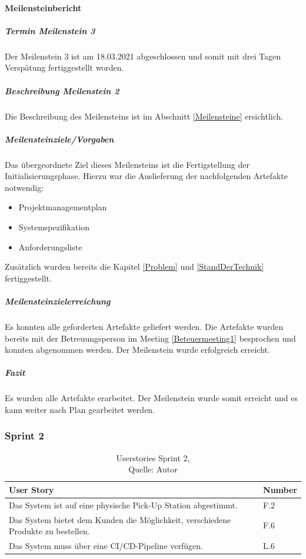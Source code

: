 \paragraph{Meilensteinbericht}
\subparagraph{Termin Meilenstein 3}
Der Meilenstein 3 ist am 18.03.2021 abgeschlossen und somit mit drei Tagen Verspätung fertiggestellt worden. 
\subparagraph{Beschreibung Meilenstein 2}
Die Beschreibung des Meilensteins ist im Abschnitt \ref{Meilensteine} ersichtlich. 
\subparagraph{Meilensteinziele/Vorgaben}
Das übergeordnete Ziel dieses Meilensteins ist die Fertigstellung der Initialisierungsphase.
Hierzu war die Auslieferung der nachfolgenden Artefakte notwendig:
\begin{itemize}
	\item Projektmanagementplan
	\item Systemspezifikation
	\item Anforderungsliste
\end{itemize}
Zusätzlich wurden bereits die Kapitel \ref{Problem} und \ref{StandDerTechnik} fertiggestellt. 
\subparagraph{Meilensteinzielerreichung}
Es konnten alle geforderten Artefakte geliefert werden. Die Artefakte wurden bereits mit der Betreuungsperson im Meeting \ref{Beteuermeeting1} besprochen und konnten abgenommen werden. 
Der Meilenstein wurde erfolgreich erreicht. 
\subparagraph{Fazit}
Es wurden alle Artefakte erarbeitet. Der Meilenstein wurde somit erreicht und es kann weiter nach Plan gearbeitet werden.

\subsubsection{Sprint 2}
\begin{table}[H]
	\begin{tabularx}{\textwidth}{|l|X|}
		\hline
		\textbf{User Story} & \textbf{Number} \\
		\hline
		Das System ist auf eine physische Pick-Up Station abgestimmt. & F.2\\
		\hline
		Das System bietet dem Kunden die Möglichkeit, verschiedene Produkte zu bestellen. & F.6\\
		\hline
		Das System muss über eine CI/CD-Pipeline verfügen. & L.6 \\
		\hline
	\end{tabularx} 
	\caption[Userstories Sprint 2]{Userstories Sprint 2,\\ Quelle: Autor}
\end{table}\label{userStoriesSprint2}

